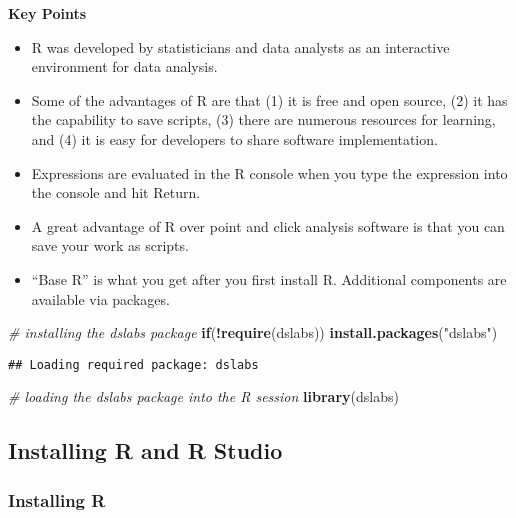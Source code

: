 \documentclass[]{article}
\newenvironment{Shaded}{\begin{snugshade}}{\end{snugshade}}
\newcommand{\CommentTok}[1]{\textcolor[rgb]{0.56,0.35,0.01}{\textit{#1}}}
\newcommand{\ControlFlowTok}[1]{\textcolor[rgb]{0.13,0.29,0.53}{\textbf{#1}}}
\newcommand{\KeywordTok}[1]{\textcolor[rgb]{0.13,0.29,0.53}{\textbf{#1}}}
\newcommand{\NormalTok}[1]{#1}
\newcommand{\OperatorTok}[1]{\textcolor[rgb]{0.81,0.36,0.00}{\textbf{#1}}}
\newcommand{\StringTok}[1]{\textcolor[rgb]{0.31,0.60,0.02}{#1}}
\providecommand{\tightlist}{%
  \setlength{\itemsep}{0pt}\setlength{\parskip}{0pt}}
\begin{document}
\textbf{Key Points}

\begin{itemize}
\tightlist
\item
  R was developed by statisticians and data analysts as an interactive
  environment for data analysis.
\item
  Some of the advantages of R are that (1) it is free and open source,
  (2) it has the capability to save scripts, (3) there are numerous
  resources for learning, and (4) it is easy for developers to share
  software implementation.
\item
  Expressions are evaluated in the R console when you type the
  expression into the console and hit Return.
\item
  A great advantage of R over point and click analysis software is that
  you can save your work as scripts.
\item
  ``Base R'' is what you get after you first install R. Additional
  components are available via packages.
\end{itemize}

\begin{Shaded}
\begin{Highlighting}[]
\CommentTok{# installing the dslabs package}
\ControlFlowTok{if}\NormalTok{(}\OperatorTok{!}\KeywordTok{require}\NormalTok{(dslabs)) }\KeywordTok{install.packages}\NormalTok{(}\StringTok{"dslabs"}\NormalTok{)}
\end{Highlighting}
\end{Shaded}

\begin{verbatim}
## Loading required package: dslabs
\end{verbatim}

\begin{Shaded}
\begin{Highlighting}[]
\CommentTok{# loading the dslabs package into the R session}
\KeywordTok{library}\NormalTok{(dslabs)}
\end{Highlighting}
\end{Shaded}

\hypertarget{installing-r-and-r-studio}{%
\subsection{Installing R and R Studio}\label{installing-r-and-r-studio}}

\hypertarget{installing-r}{%
\subsubsection{Installing R}\label{installing-r}}
\end{document}
